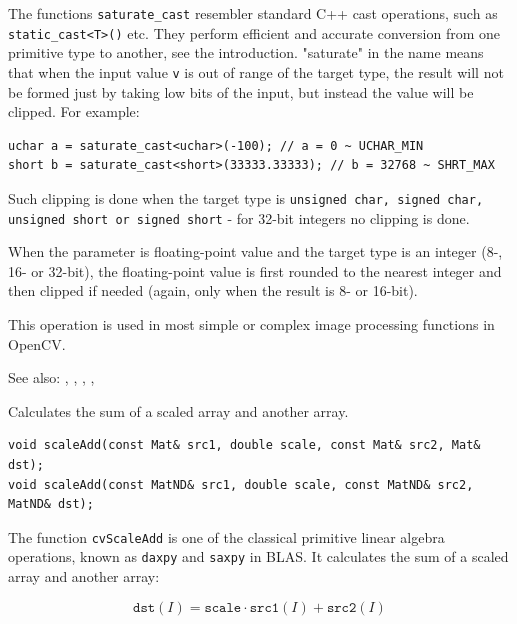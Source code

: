 The functions \texttt{saturate\_cast} resembler standard C++ cast operations, such as \texttt{static\_cast<T>()} etc. They perform efficient and accurate conversion from one primitive type to another, see the introduction. "saturate" in the name means that when the input value \texttt{v} is out of range of the target type, the result will not be formed just by taking low bits of the input, but instead the value will be clipped. For example:

\begin{lstlisting}
uchar a = saturate_cast<uchar>(-100); // a = 0 ~ UCHAR_MIN
short b = saturate_cast<short>(33333.33333); // b = 32768 ~ SHRT_MAX
\end{lstlisting}

Such clipping is done when the target type is \texttt{unsigned char, signed char, unsigned short or signed short} - for 32-bit integers no clipping is done.

When the parameter is floating-point value and the target type is an integer (8-, 16- or 32-bit), the floating-point value is first rounded to the nearest integer and then clipped if needed (again, only when the result is 8- or 16-bit).

This operation is used in most simple or complex image processing functions in OpenCV.

See also: , , , , 

\label{scaleAdd}
Calculates the sum of a scaled array and another array.

\begin{lstlisting}
void scaleAdd(const Mat& src1, double scale, const Mat& src2, Mat& dst);
void scaleAdd(const MatND& src1, double scale, const MatND& src2, MatND& dst);
\end{lstlisting}
\begin{description}
\end{description}

The function \texttt{cvScaleAdd} is one of the classical primitive linear algebra operations, known as \texttt{daxpy} and \texttt{saxpy} in BLAS. It calculates the sum of a scaled array and another array:

\[
\texttt{dst}(I)=\texttt{scale} \cdot \texttt{src1}(I) + \texttt{src2}(I)
\]

